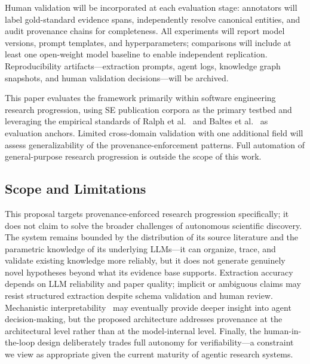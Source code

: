 Human validation will be incorporated at each evaluation stage: annotators will label gold-standard evidence spans, independently resolve canonical entities, and audit provenance chains for completeness. All experiments will report model versions, prompt templates, and hyperparameters; comparisons will include at least one open-weight model baseline to enable independent replication. Reproducibility artifacts---extraction prompts, agent logs, knowledge graph snapshots, and human validation decisions---will be archived.

This paper evaluates the framework primarily within software engineering research progression, using SE publication corpora as the primary testbed and leveraging the empirical standards of Ralph et al.~\cite{ralph2021empirical} and Baltes et al.~\cite{baltes2025guidelines} as evaluation anchors. Limited cross-domain validation with one additional field will assess generalizability of the provenance-enforcement patterns. Full automation of general-purpose research progression is outside the scope of this work.

\subsection{Scope and Limitations}
\label{sec:proposal-limitations}

This proposal targets provenance-enforced research progression specifically; it does not claim to solve the broader challenges of autonomous scientific discovery. The system remains bounded by the distribution of its source literature and the parametric knowledge of its underlying LLMs---it can organize, trace, and validate existing knowledge more reliably, but it does not generate genuinely novel hypotheses beyond what its evidence base supports. Extraction accuracy depends on LLM reliability and paper quality; implicit or ambiguous claims may resist structured extraction despite schema validation and human review. Mechanistic interpretability~\cite{sharkey2025mechanistic} may eventually provide deeper insight into agent decision-making, but the proposed architecture addresses provenance at the architectural level rather than at the model-internal level. Finally, the human-in-the-loop design deliberately trades full autonomy for verifiability---a constraint we view as appropriate given the current maturity of agentic research systems.
